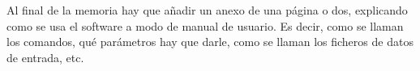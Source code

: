 \documentclass[a4paper,11pt]{book}
\begin{document}
Al final de la memoria hay que añadir un anexo de una página o dos, explicando como se usa el software a modo de manual de usuario. Es decir, como se llaman los comandos, qué parámetros hay que darle, como se llaman los ficheros de datos de entrada, etc.



%
%
%
%
%
%
%
%
%
%
%
%
%
%
%
%
%
%
%
%
%
\chapter*{}
\thispagestyle{empty}
\end{document}
